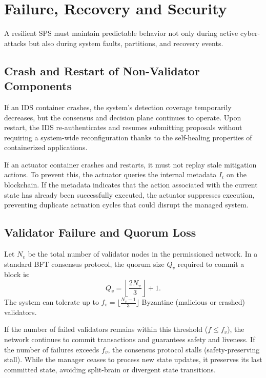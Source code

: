 \section{Failure, Recovery and Security}
\label{sec:failure_recovery_semantics}

A resilient SPS must maintain predictable behavior not only during active cyber-attacks but also during system faults, partitions, and recovery events.

\subsection{Crash and Restart of Non-Validator Components}
\label{subsec:crash_restart_nonvalidators}

If an IDS container crashes, the system's detection coverage temporarily decreases, but the consensus and decision plane continues to operate. Upon restart, the IDS re-authenticates and resumes submitting proposals without requiring a system-wide reconfiguration thanks to the self-healing properties of containerized applications. 

If an actuator container crashes and restarts, it must not replay stale mitigation actions. To prevent this, the actuator queries the internal metadata $I_t$ on the blockchain. If the metadata indicates that the action associated with the current state has already been successfully executed, the actuator suppresses execution, preventing duplicate actuation cycles that could disrupt the managed system.

\subsection{Validator Failure and Quorum Loss}
\label{subsec:validator_failure_quorum}

Let $N_v$ be the total number of validator nodes in the permissioned network. In a standard BFT consensus protocol, the quorum size $Q_v$ required to commit a block is:
\[
Q_v = \left\lfloor\frac{2N_v}{3}\right\rfloor + 1.
\]
The system can tolerate up to $f_v = \lfloor \frac{N_v - 1}{3} \rfloor$ Byzantine (malicious or crashed) validators. 

If the number of failed validators remains within this threshold ($f \le f_v$), the network continues to commit transactions and guarantees safety and liveness. If the number of failures exceeds $f_v$, the consensus protocol stalls (safety-preserving stall). While the manager ceases to process new state updates, it preserves its last committed state, avoiding split-brain or divergent state transitions.

